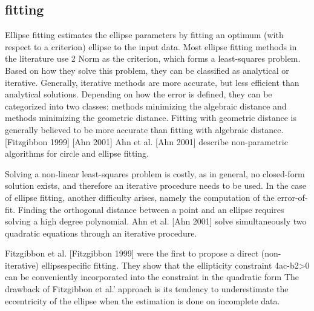 \documentclass[a4paper]{report}
\begin{document}
\subsection{fitting}
Ellipse fitting estimates the ellipse parameters by fitting an optimum (with respect to a criterion) ellipse to the input data.
Most ellipse fitting methods in the literature use 2 Norm as the criterion, which forms a least-squares problem.
Based on how they solve this problem, they can be classified as analytical or iterative. Generally, iterative methods are more accurate, but less efficient than analytical solutions.
Depending on how the error is defined, they can be categorized into two classes: methods minimizing the algebraic distance and methods minimizing the geometric distance. Fitting with geometric distance is generally believed to be more accurate than fitting with algebraic distance.
[Fitzgibbon 1999]
[Ahn 2001]
Ahn et al. [Ahn 2001] describe non-parametric algorithms for circle and ellipse fitting.


Solving a non-linear least-squares problem is costly, as in general, no closed-form solution
exists, and therefore an iterative procedure needs to be used. In the case of ellipse fitting,
another difficulty arises, namely the computation of the error-of-fit. Finding the orthogonal
distance between a point and an ellipse requires solving a high degree polynomial.
Ahn et al. [Ahn 2001] solve simultaneously two quadratic equations through
an iterative procedure. 

Fitzgibbon et al. [Fitzgibbon 1999] were the first to propose a direct (non-iterative) ellipsespecific
fitting. They show that the ellipticity constraint 4ac-b2>0 can be conveniently
incorporated into the constraint in the quadratic form
The drawback of Fitzgibbon et al.’
approach is its tendency to underestimate the eccentricity of the ellipse when the estimation is
done on incomplete data.






 

\end{document}
